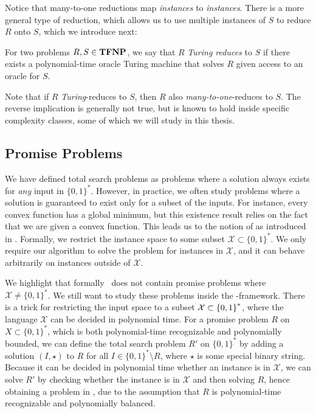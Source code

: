 Notice that many-to-one reductions map \emph{instances} to \emph{instances}. There is a more general type of reduction, which allows us to use multiple instances of $S$ to reduce $R$ onto $S$, which we introduce next:

\begin{definition}
	For two problems $R, S \in \textbf{TFNP}$, we say that $R$ \emph{Turing reduces} to $S$ if there exists a polynomial-time oracle Turing machine that solves $R$ given access to an oracle for $S$.
\end{definition}

Note that if $R$ \emph{Turing}-reduces to $S$, then $R$ also \emph{many-to-one}-reduces to $S$. The reverse implication is generally not true, but is known to hold inside specific complexity classes, some of which we will study in this thesis.

\subsection{Promise Problems}
\label{sec:promise_problems}

We have defined total search problems as problems where a solution always exists for \emph{any} input in $\{0, 1\}^*$. However, in practice, we often study problems where a solution is guaranteed to exist only for a subset of the inputs. For instance, every convex function has a global minimum, but this existence result relies on the fact that we are given a convex function. This leads us to the notion of  as introduced in . Formally, we restrict the instance space to some subset $\mathcal{X} \subset \{0, 1\}^*$. We only require our algorithm to solve the problem for instances in $\mathcal{X}$, and it can behave arbitrarily on instances outside of $\mathcal{X}$.

We highlight that formally \TFNP\ does not contain promise problems where $\mathcal{X} \neq \{0, 1\}^*$. We still want to study these problems inside the \TFNP-framework. There is a trick for restricting the input space to a subset $\mathcal{X} \subset \left\{0, 1\right\}^*$, where the language $\mathcal{X}$ can be decided in polynomial time. For a promise problem $R$ on $X \subset \{0, 1\}^*$, which is both polynomial-time recognizable and polynomially bounded, we can define the total search problem $R'$ on $\{0, 1\}^*$ by adding a solution $(I, \star)$ to $R$ for all $I \in \{0, 1\}^* \setminus R$, where $\star$ is some special binary string. Because it can be decided in polynomial time whether an instance is in $\mathcal{X}$, we can solve $R'$ by checking whether the instance is in $\mathcal{X}$ and then solving $R$, hence obtaining a problem in \TFNP, due to the assumption that $R$ is polynomial-time recognizable and polynomially balanced.

